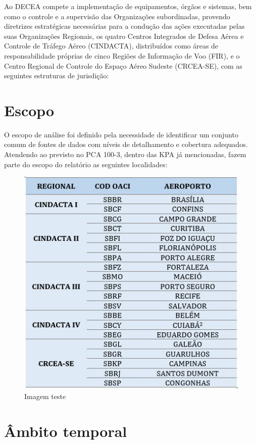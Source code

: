 \documentclass[
]{book}
\theoremstyle{definition}
\theoremstyle{definition}
\theoremstyle{definition}
\theoremstyle{definition}
\theoremstyle{remark}
\begin{document}
Ao DECEA compete a implementação de equipamentos, órgãos e sistemas, bem como o controle e a supervisão das Organizações subordinadas, provendo diretrizes estratégicas necessárias para a condução das ações executadas pelas suas Organizações Regionais, os quatro Centros Integrados de Defesa Aérea e Controle de Tráfego Aéreo (CINDACTA), distribuídos como áreas de responsabilidade próprias de cinco Regiões de Informação de Voo (FIR), e o Centro Regional de Controle do Espaço Aéreo Sudeste (CRCEA-SE), com as seguintes estruturas de jurisdição:

\hypertarget{escopo}{%
\section{Escopo}\label{escopo}}

O escopo de análise foi definido pela necessidade de identificar um conjunto comum de fontes de dados com níveis de detalhamento e cobertura adequados. Atendendo ao previsto no PCA 100-3, dentro das KPA já mencionadas, fazem parte do escopo do relatório as seguintes localidades:

\begin{figure}
\centering
\includegraphics{imagens/fig8.jpg}
\caption{Imagem teste}
\end{figure}

\hypertarget{uxe2mbito-temporal}{%
\section{Âmbito temporal}\label{uxe2mbito-temporal}}
\end{document}
